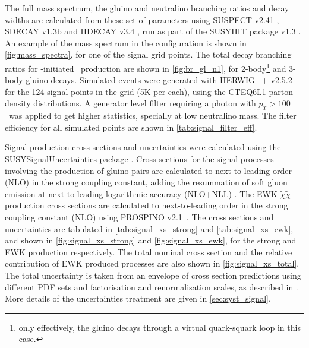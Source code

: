 The full mass spectrum, the gluino and neutralino branching ratios and decay widths are calculated from
these set of parameters using SUSPECT v2.41 \cite{Djouadi2007426}, SDECAY v1.3b \cite{Muhlleitner:2004mka}
and HDECAY v3.4 \cite{Djouadi:1997yw}, run as part of the SUSYHIT package v1.3 \cite{Djouadi:2006bz}.
An example of the mass spectrum in the configuration is shown in {\fig} \ref{fig:mass_spectra}, for one of
the signal grid points. The total decay branching ratios for \gluino-initiated \ninoone\ production are
shown in {\fig} \ref{fig:br_gl_n1}, for 2-body\footnote{only effectively, the gluino decays through a virtual
quark-squark loop in this case.} and 3-body gluino decays.
Simulated events were generated with HERWIG++ v2.5.2 \cite{Bahr:2008pv} for the 124 signal points in the
grid (5K per each), using the CTEQ6L1 \cite{Nadolsky:2008zw} parton density distributions. A generator level
filter requiring a photon with $p_{T}>100~$ \gev\ was applied to get higher statistics, specially at low neutralino
mass. The filter efficiency for all simulated points are shown in {\tab} \ref{tab:signal_filter_eff}.

Signal production cross sections and uncertainties were calculated using the SUSYSignalUncertainties package \cite{SUSYsigunc}. Cross sections
for the signal processes involving the production of gluino pairs are calculated to next-to-leading order (NLO)
in the strong coupling constant, adding the resummation of soft gluon emission at next-to-leading-logarithmic
accuracy (NLO+NLL) \cite{Beenakker:1996ch,Kulesza:2008jb,Kulesza:2009kq,Beenakker:2009ha,Beenakker:2011fu}.
The EWK $\tilde{\chi}\tilde{\chi}$ production cross sections are calculated to next-to-leading order in the strong coupling constant (NLO) using PROSPINO v2.1~\cite{Beenakker:1999xh}.
The cross sections and uncertainties are tabulated in {\tab} \ref{tab:signal_xs_strong} and \ref{tab:signal_xs_ewk}, and shown in {\fig} \ref{fig:signal_xs_strong} and \ref{fig:signal_xs_ewk}, for the strong and EWK production respectively.
The total nominal cross section and the relative contribution of EWK produced processes are also shown in {\fig} \ref{fig:signal_xs_total}.
The total uncertainty is taken from an envelope of cross section predictions using different PDF
sets and factorisation and renormalisation scales, as described in \cite{Kramer:2012bx}.
More details of the uncertainties treatment are given in {\Sec} \ref{sec:syst_signal}. %

